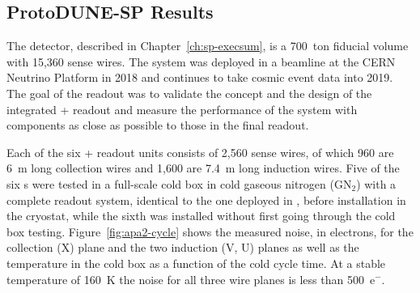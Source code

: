 \subsection{ProtoDUNE-SP Results}
\label{sec:fdsp-tpcelec-overview-pdune}

The %
detector, described 
in Chapter~\ref{ch:sp-execsum}, is a 700~ton fiducial volume 
 with 15,360 sense wires. 
The system was deployed in a beamline at the CERN Neutrino Platform 
in 2018 and continues to take cosmic event data into 2019. The goal of 
the   readout was to validate the concept 
and the design of the integrated + readout 
and measure the performance of the  system with components 
as close as possible to those in the final   readout.

Each of the six  +
readout units consists of 2,560 sense wires, of which 960 are \SI{6}{m} 
long collection wires and 1,600 are \SI{7.4}{m} long induction wires. 
Five of the six s were tested in a full-scale cold box in 
cold gaseous nitrogen (GN$_2$) with a complete  readout system,  
identical to the one %
deployed in , before installation in the cryostat,
while the sixth %
 was installed without first going through the cold
box testing. Figure~\ref{fig:apa2-cycle} shows the measured noise, in 
electrons, for the collection (X) plane and the two induction (V, U) 
planes as well as the  temperature in the cold box as a 
function of the cold cycle time. At a stable temperature of 
\SI{160}{K} the noise for all three wire planes is less than 500~e$^-$.


